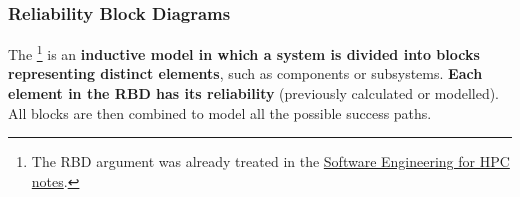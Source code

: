 \newpage

\subsubsection{Reliability Block Diagrams}

The \footnote{The RBD argument was already treated in the \href{https://github.com/PoliMI-HPC-E-notes-projects-AndreVale69/HPC-E-PoliMI-university-notes/tree/main/software-engineering-for-hpc}{Software Engineering for HPC notes}.} is an \textbf{inductive model in which a system is divided into blocks representing distinct elements}, such as components or subsystems. \textbf{Each element in the RBD has its reliability} (previously calculated or modelled). All blocks are then combined to model all the possible success paths.

